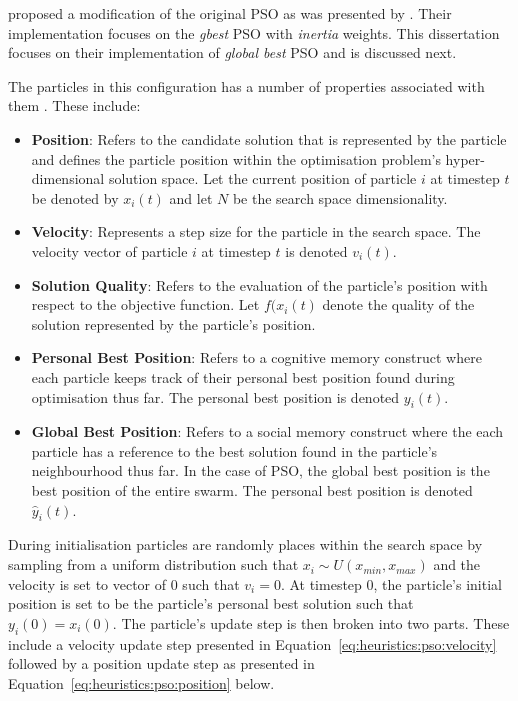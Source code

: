 \citeauthor{ref:shi:1998}\cite{ref:shi:1998} proposed a modification of the original \ac{PSO} as was presented by \citeauthor{ref:kennedy:1995}. Their implementation focuses on the \textit{gbest} \ac{PSO} with \textit{inertia} weights. This dissertation focuses on their implementation of \textit{global best} \ac{PSO} and is discussed next.

The particles in this configuration has a number of properties associated with them \cite{ref:vanwyk:2014}. These include:

\begin{itemize}
      \item \textbf{Position}: Refers to the candidate solution that is represented by the particle and defines the particle position within the optimisation problem's hyper-dimensional solution space. Let the current position of particle $i$ at timestep $t$ be denoted by $x_{i}(t)$ and let $N$ be the search space dimensionality.
      \item \textbf{Velocity}: Represents a step size for the particle in the search space. The velocity vector of particle $i$ at timestep $t$ is denoted $v_{i}(t)$.
      \item \textbf{Solution Quality}: Refers to the evaluation of the particle's position with respect to the objective function. Let $f(x_{i}(t)$ denote the quality of the solution represented by the particle's position.
      \item \textbf{Personal Best Position}: Refers to a cognitive memory construct where each particle keeps track of their personal best position found during optimisation thus far. The personal best position is denoted $y_{i}(t)$.
      \item \textbf{Global Best Position}: Refers to a social memory construct where the each particle has a reference to the best solution found in the particle's neighbourhood thus far. In the case of  \ac{PSO}, the global best position is the best position of the entire swarm. The personal best position is denoted $\hat{y}_{i}(t)$.
\end{itemize}

During initialisation particles are randomly places within the search space by sampling from a uniform distribution such that $x_{i} \sim U(x_{min}, x_{max})$ and the velocity is set to vector of 0 such that $v_{i} = 0$. At timestep 0, the particle's initial position is set to be the particle's personal best solution such that $y_{i}(0) = x_{i}(0)$. The particle's update step is then broken into two parts. These include a velocity update step presented in Equation~\ref{eq:heuristics:pso:velocity} followed by a position update step as presented in Equation~\ref{eq:heuristics:pso:position} below.

